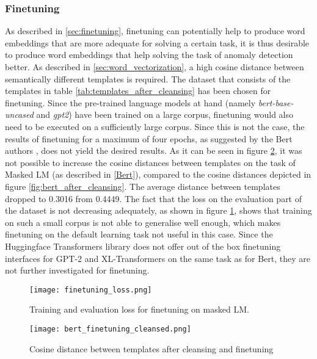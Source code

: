 \subsubsection{Finetuning}
As described in \ref{sec:finetuning}, finetuning can potentially help to produce word embeddings that are more adequate for solving a certain task, it is thus desirable to produce word embeddings that help solving the task of anomaly detection better. As described in \ref{sec:word_vectorization}, a high cosine distance between semantically different templates is required. The dataset that consists of the templates in table \ref{tab:templates_after_cleansing} has been chosen for finetuning. Since the pre-trained language models at hand (namely \textit{bert-base-uncased} and \textit{gpt2}) have been trained on a large corpus, finetuning would also need to be executed on a sufficiently large corpus. Since this is not the case, the results of finetuning for a maximum of four epochs, as suggested by the Bert authors \cite{devlin2018bert}, does not yield the desired results. As it can be seen in figure \ref{fig:cos_distance_finetuning}, it was not possible to increase the cosine distances between templates on the task of Masked LM (as described in \ref{Bert}), compared to the cosine distances depicted in figure \ref{fig:bert_after_cleansing}. The average distance between templates dropped to 0.3016 from 0.4449. The fact that the loss on the evaluation part of the dataset is not decreasing adequately, as shown in figure \ref{fig:finetuning_loss}, shows that training on such a small corpus is not able to generalise well enough, which makes finetuning on the default learning task not useful in this case. Since the Huggingface Transformers library does not offer out of the box finetuning interfaces for GPT-2 and XL-Transformers on the same task as for Bert, they are not further investigated for finetuning.

\begin{figure}[H]
  \centering
  \texttt{[image: finetuning\_loss.png]}\\
  \caption{Training and evaluation loss for finetuning on masked LM.}
  \label{fig:finetuning_loss}
\end{figure}

\begin{figure}[h]
  \centering
  \texttt{[image: bert\_finetuning\_cleansed.png]}\\
  \caption{Cosine distance between templates after cleansing and finetuning}
  \label{fig:cos_distance_finetuning}
\end{figure}


